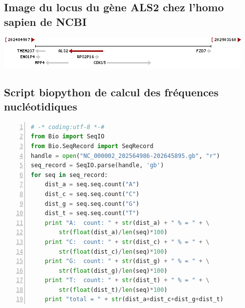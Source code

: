 \documentclass[11pt]{article} %
\begin{document}
\subsection{Image du locus du gène ALS2 chez l'homo sapien de NCBI}\label{2}
\includegraphics{annexes/annexe1_ncbi_als2.png}

\subsection{Script biopython de calcul des fréquences nucléotidiques}\label{3}
\begin{lstlisting}[frame=single,numbers=left,language=Python]
# -* coding:utf-8 *-#
from Bio import SeqIO
from Bio.SeqRecord import SeqRecord
handle = open("NC_000002_202564986-202645895.gb", "r")
seq_record = SeqIO.parse(handle, 'gb')
for seq in seq_record:
    dist_a = seq.seq.count("A")
    dist_c = seq.seq.count("C")
    dist_g = seq.seq.count("G")
    dist_t = seq.seq.count("T")
    print "A:  count: " + str(dist_a) + " % = " + \
        str(float(dist_a)/len(seq)*100)
    print "C:  count: " + str(dist_c) + " % = " + \
        str(float(dist_c)/len(seq)*100)
    print "G:  count: " + str(dist_g) + " % = " + \
        str(float(dist_g)/len(seq)*100)
    print "T:  count: " + str(dist_t) + " % = " + \
        str(float(dist_t)/len(seq)*100)
    print "total = " + str(dist_a+dist_c+dist_g+dist_t)
\end{lstlisting}
\end{document}
